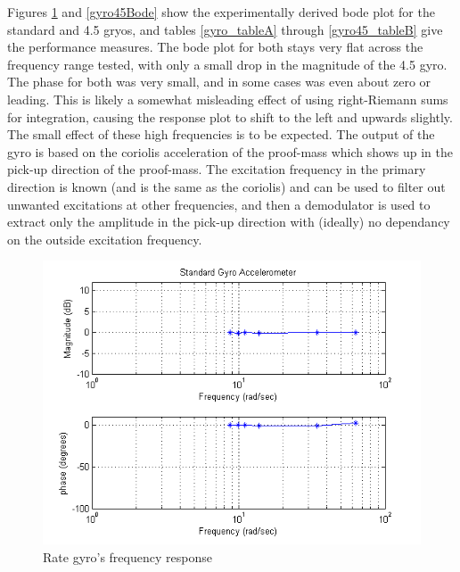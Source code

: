 \documentclass{article}
\theoremstyle{plain}
\theoremstyle{definition}
\theoremstyle{remark}
\begin{document}
Figures \ref{gyroBode} and \ref{gyro45Bode} show the experimentally derived bode plot for the standard and 4.5 gryos, and tables \ref{gyro_tableA} through \ref{gyro45_tableB} give the performance measures. The bode plot for both stays very flat across the frequency range tested, with only a small drop in the magnitude of the 4.5 gyro. The phase for both was very small, and in some cases was even  about zero or leading. This is likely a somewhat misleading effect of using right-Riemann sums for integration, causing the response plot to shift to the left and upwards slightly. The small effect of these high frequencies is to be expected. The output of the gyro is based on the coriolis acceleration of the proof-mass which shows up in the pick-up direction of the proof-mass. The excitation frequency in the primary direction is known (and is the same as the coriolis) and can be used to filter out unwanted excitations at other frequencies, and then a demodulator is used to extract only the amplitude in the pick-up direction with (ideally) no dependancy on the outside excitation frequency. \\ 

\begin{figure}[hbt]
\begin{center}
\includegraphics[width = 14cm]{GyroBode.png}
\caption{Rate gyro's frequency response}
\label{gyroBode}
\end{center}
\end{figure}
\end{document}
